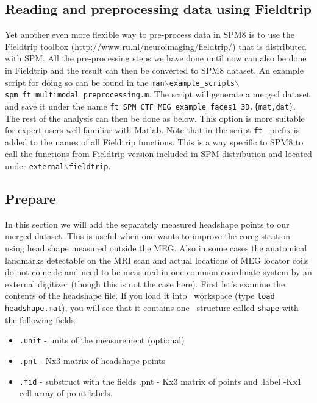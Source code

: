 \subsection{Reading and preprocessing data using Fieldtrip}
Yet another even more flexible way to pre-process data in SPM8 is to use the Fieldtrip toolbox (\url{http://www.ru.nl/neuroimaging/fieldtrip/}) that is distributed with SPM. All the pre-processing steps we have done until now can also be done in Fieldtrip and the result can then be converted to SPM8 dataset. An example script for doing so can be found in the 
\texttt{man$\backslash$example\_scripts$\backslash$spm\_ft\_multimodal\_preprocessing.m}. The script will generate a merged dataset and save it under the name \texttt{ft\_SPM\_CTF\_\-MEG\_\-example\_\-faces1\_\-3D.\{mat,dat\}}. The rest of the analysis can then be done as below. This option is more suitable for expert users well familiar with Matlab. Note that in the script \texttt{ft\_} prefix is added to the names of all Fieldtrip functions. This is a way specific to SPM8 to call the functions from Fieldtrip version included in SPM distribution and located under \texttt{external$\backslash$fieldtrip}.

\subsection{Prepare}

In this section we will add the separately measured headshape points to our merged dataset. This is useful when one wants to improve the coregistration using head shape measured outside the MEG. Also in some cases the anatomical landmarks detectable on the MRI scan and actual locations of MEG locator coils do not coincide and need to be measured in one common coordinate system by an external digitizer (though this is not the case here). First let's examine the contents of the headshape file. If you load it into \matlab\ workspace (type \texttt{load headshape.mat}), you will see that it contains one \matlab\ structure called \texttt{shape} with the following fields:
\begin{itemize}
\item \texttt{.unit} - units of the measurement (optional)
\item \texttt{.pnt} - Nx3 matrix of headshape points
\item \texttt{.fid} - substruct with the fields .pnt - Kx3 matrix of points and .label -Kx1 cell array of point labels.
\end{itemize}

